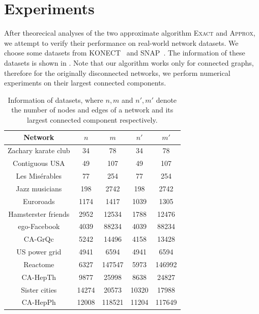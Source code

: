 \documentclass[sigconf]{acmart}
\begin{document}
\section{Experiments}\label{sec:experiments}

After theorecical analyses of the two approximate algorithm \textsc{Exact} and \textsc{Approx}, we attempt to verify their performance on real-world network datasets.
We choose some datasets from KONECT~\cite{Ku13} and SNAP~\cite{JuAn14}.
The information of these datasets is shown in .
Note that our algorithm works only for connected graphs, therefore for the originally disconnected networks, we perform numerical experiments on their largest connected components.
\begin{table}
    \caption{Information of datasets, where \(n,m\) and \(n',m'\) denote the number of nodes and edges of a network and its largest connected component respectively.}
    \label{tab:info}
    \begin{tabular}{ccccc}
        \toprule
        Network             & \(n\)   & \(m\)   & \(n'\)  & \(m'\)  \\
        \midrule
        Zachary karate club & 34      & 78      & 34      & 78      \\
        Contiguous USA      & 49      & 107     & 49      & 107     \\
        Les Misérables      & 77      & 254     & 77      & 254     \\
        Jazz musicians      & 198     & 2742    & 198     & 2742    \\
        Euroroads           & 1174    & 1417    & 1039    & 1305    \\
        Hamsterster friends & 2952    & 12534   & 1788    & 12476   \\
        ego-Facebook        & 4039    & 88234   & 4039    & 88234   \\
        CA-GrQc             & 5242    & 14496   & 4158    & 13428   \\
        US power grid       & 4941    & 6594    & 4941    & 6594    \\
        Reactome            & 6327    & 147547  & 5973    & 146992  \\
        CA-HepTh            & 9877    & 25998   & 8638    & 24827   \\
        Sister cities       & 14274   & 20573   & 10320   & 17988   \\
        CA-HepPh            & 12008   & 118521  & 11204   & 117649  \\

\end{tabular}
\end{table}
\end{document}
